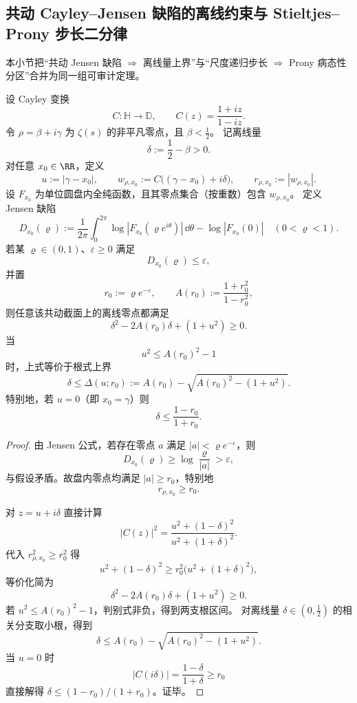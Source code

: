 \subsection{共动 Cayley--Jensen 缺陷的离线约束与 Stieltjes--Prony 步长二分律}\label{subsec:conclusion-comoving-cayley-jensen-prony-step-law}
本小节把“共动 Jensen 缺陷 \(\Rightarrow\) 离线量上界”与“尺度递归步长 \(\Rightarrow\) Prony 病态性分区”合并为同一组可审计定理。

\begin{theorem}[偏移共动坐标下离线量的根式上界]\label{thm:conclusion-comoving-cayley-jensen-offline-root-bound}
设 Cayley 变换
\[
C:\mathbb H\to\mathbb D,\qquad
C(z)=\frac{1+iz}{1-iz}.
\]
令 \(\rho=\beta+i\gamma\) 为 \(\zeta(s)\) 的非平凡零点，且 \(\beta<\tfrac12\)。
记离线量
\[
\delta:=\frac12-\beta>0.
\]
对任意 \(x_0\in\RR\)，定义
\[
u:=|\gamma-x_0|,\qquad
w_{\rho,x_0}:=C\big((\gamma-x_0)+i\delta\big),\qquad
r_{\rho,x_0}:=|w_{\rho,x_0}|.
\]
设 \(F_{x_0}\) 为单位圆盘内全纯函数，且其零点集合（按重数）包含 \(w_{\rho,x_0}\)。
定义 Jensen 缺陷
\[
D_{x_0}(\varrho)
:=
\frac1{2\pi}\int_0^{2\pi}\log|F_{x_0}(\varrho e^{i\theta})|\,\dd\theta
-\log|F_{x_0}(0)|
\quad(0<\varrho<1).
\]
若某 \(\varrho\in(0,1)\)、\(\varepsilon\ge 0\) 满足
\[
D_{x_0}(\varrho)\le \varepsilon,
\]
并置
\[
r_0:=\varrho e^{-\varepsilon},
\qquad
A(r_0):=\frac{1+r_0^2}{1-r_0^2},
\]
则任意该共动截面上的离线零点都满足
\[
\delta^2-2A(r_0)\delta+(1+u^2)\ge 0.
\]
当
\[
u^2\le A(r_0)^2-1
\]
时，上式等价于根式上界
\[
\delta\le \Delta(u;r_0):=
A(r_0)-\sqrt{A(r_0)^2-(1+u^2)}.
\]
特别地，若 \(u=0\)（即 \(x_0=\gamma\)）则
\[
\delta\le \frac{1-r_0}{1+r_0}.
\]
\end{theorem}
\begin{proof}
由 Jensen 公式，若存在零点 \(a\) 满足 \(|a|<\varrho e^{-\varepsilon}\)，则
\[
D_{x_0}(\varrho)\ge \log\frac{\varrho}{|a|}>\varepsilon,
\]
与假设矛盾。故盘内零点均满足 \(|a|\ge r_0\)，特别地
\[
r_{\rho,x_0}\ge r_0.
\]

对 \(z=u+i\delta\) 直接计算
\[
|C(z)|^2
=
\frac{u^2+(1-\delta)^2}{u^2+(1+\delta)^2}.
\]
代入 \(r_{\rho,x_0}^2\ge r_0^2\) 得
\[
u^2+(1-\delta)^2\ge r_0^2\bigl(u^2+(1+\delta)^2\bigr),
\]
等价化简为
\[
\delta^2-2A(r_0)\delta+(1+u^2)\ge 0.
\]
若 \(u^2\le A(r_0)^2-1\)，判别式非负，得到两支根区间。
对离线量 \(\delta\in(0,\tfrac12)\) 的相关分支取小根，得到
\[
\delta\le A(r_0)-\sqrt{A(r_0)^2-(1+u^2)}.
\]
当 \(u=0\) 时
\[
|C(i\delta)|=\frac{1-\delta}{1+\delta}\ge r_0
\]
直接解得 \(\delta\le(1-r_0)/(1+r_0)\)。证毕。
\end{proof}

